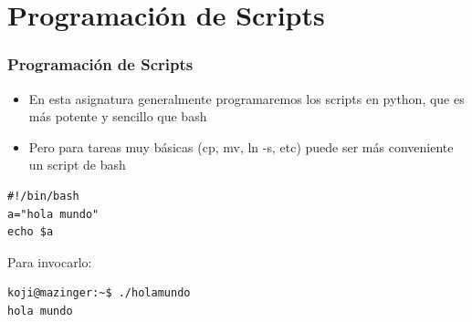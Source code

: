 \documentclass[ucs]{beamer}
\begin{document}
\section{Programación de Scripts}


\begin{frame}[fragile]
\frametitle{Programación de Scripts}
\begin{itemize}
\item
En esta asignatura generalmente programaremos los scripts en python, que es más potente
y sencillo que bash
\item
Pero para tareas muy básicas (cp, mv, ln -s, etc) puede ser más
conveniente un script de bash
\end{itemize}

  \begin{footnotesize}
  \begin{verbatim}
#!/bin/bash
a="hola mundo"
echo $a 
  \end{verbatim}
  \end{footnotesize}

Para invocarlo:

  \begin{footnotesize}
  \begin{verbatim}
koji@mazinger:~$ ./holamundo 
hola mundo
  \end{verbatim}
  \end{footnotesize}

\end{frame}
\end{document}

